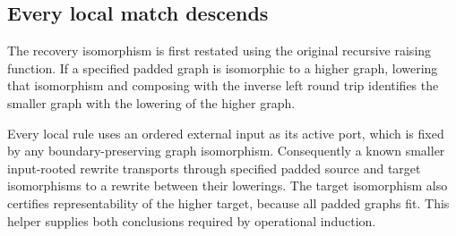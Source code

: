 


\subsection{Every local match descends}

The recovery isomorphism is first restated using the original recursive
raising function. If a specified padded graph is isomorphic to a higher graph,
lowering that isomorphism and composing with the inverse left round trip
identifies the smaller graph with the lowering of the higher graph.

Every local rule uses an ordered external input as its active port, which
is fixed by any boundary-preserving graph isomorphism. Consequently a known
smaller input-rooted rewrite transports through specified padded source and
target isomorphisms to a rewrite between their lowerings. The target
isomorphism also certifies representability of the higher target, because
all padded graphs fit. This helper supplies both conclusions required by
operational induction.




